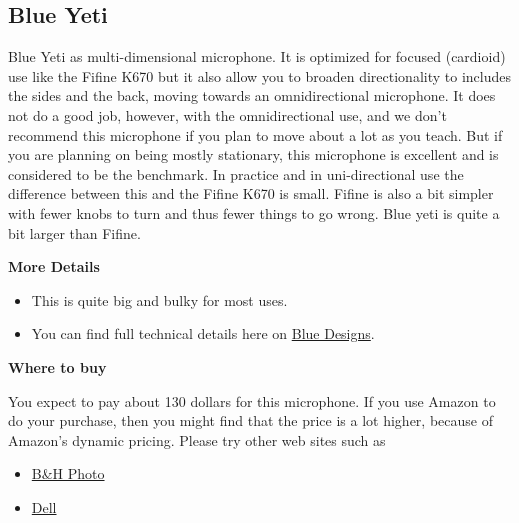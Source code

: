\subsection{Blue Yeti}
\label{sec:equipment::blueyeti}

\begin{gram}
\label{grm:equipment::blueyeti::main}
%
Blue Yeti as multi-dimensional microphone.
%
It is optimized for focused (cardioid) use like the Fifine K670
but it also allow you to broaden directionality to includes the sides
and the back, moving towards an omnidirectional microphone.
%
It does not do a good job, however, with the omnidirectional use, and we don't recommend this microphone if you plan to move about a lot as you teach.
%
But if you are planning on being mostly stationary, this microphone is excellent and is considered to be the benchmark.
%
In practice and in uni-directional use the difference between this and
the Fifine K670 is small.  Fifine is also a bit simpler with fewer knobs to turn and thus fewer things to go wrong.  Blue yeti is quite a bit larger than Fifine.


\textbf{More Details}

\begin{itemize}
\item This is quite big and bulky for most uses. 
\item 
You can find full technical details here on \href{https://www.bluedesigns.com/products/yeti/}{Blue Designs}.
\end{itemize}

\textbf{Where to buy}

You expect to pay about 130 dollars for this microphone.  If you use Amazon to do your purchase, then you might find that the price is a lot higher, because of Amazon's dynamic pricing.  Please try other web sites such as 

\begin{itemize}
\item
\href{https://www.bhphotovideo.com/c/product/1252288-REG/blue_yeti_whiteout_yeti_usb_microphone_whiteout.html/?ap=y&ap=y&smp=y&smp=y&lsft=BI%3A514&gclid=CjwKCAjwgdX4BRB_EiwAg8O8HaL477lNngiVZfES7WLhUcJSUUvOZpExsDJj6nonuKow3CfyNGzRqRoC-dAQAvD_BwE}{B\&H Photo}
\item 
\href{https://www.dell.com/en-us/shop/blue-microphones-yeti-microphone-usb-aztec-copper/apd/aa829519?gacd=9614064-1012-5761040-0-0&dgc=st&gclid=CjwKCAjwgdX4BRB_EiwAg8O8HUjMAfBK6gO_-L-fdNSOjOlY2YqmqpLKR2qxP7hb-yRx8xlw1bscKBoCk0wQAvD_BwE&gclsrc=aw.ds}{Dell}
\end{itemize}
\end{gram}


